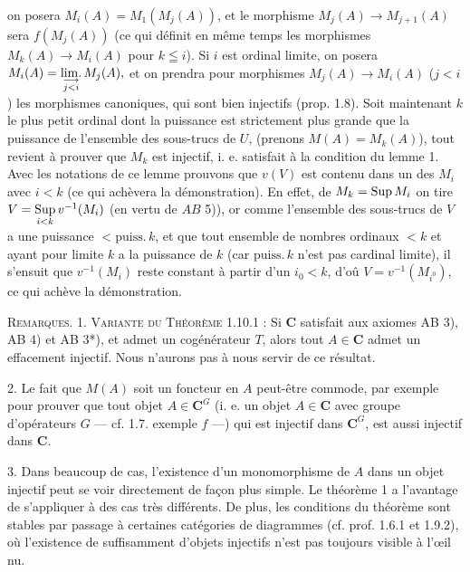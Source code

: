 
\noindent on posera $M_i(A)=M_1(M_j(A))$, et le morphisme
$M_j(A)\to M_{j+1}(A)$ sera $f(M_j(A))$ (ce qui définit en même
temps les morphismes $M_k(A)\to M_i(A)$ pour $k\leqq i$). Si $i$
est ordinal limite, on posera
$M_i(A)=\mathop{\rm lim.}\limits_{\substack{\longrightarrow\\j<i}}M_j(A),$ et on prendra pour morphismes $M_j(A)\to M_i(A)$
($j<i$) les morphismes canoniques, qui sont bien injectifs (prop. 1.8). Soit
maintenant $k$ le plus petit ordinal dont la puissance est strictement plus
grande que la puissance de l'ensemble des sous-trucs de $U$, (prenons
$M(A)=M_k(A)$), tout revient à prouver que $M_k$ est injectif, i. e. satisfait
à la condition du lemme 1. Avec les notations de ce lemme prouvons que $v(V)$
est contenu dans un des $M_i$ avec $i<k$ (ce qui achèvera la démonstration).
En effet, de $M_k=\mathop{\rm Sup}M_i$ on tire
$V=\mathop{\rm Sup}\limits_{i<k}v^{-1}(M_i)$ (en vertu de $AB$ 5)), or comme l'ensemble des sous-trucs de $V$ a une
puissance $<\mathrm{puiss.}\,k$, et que tout ensemble de nombres ordinaux $<k$
et ayant pour limite $k$ a la puissance de $k$ (car $\mathrm{puiss.}\,k$ n'est
pas cardinal limite), il s'ensuit que $v^{-1}(M_i)$ reste constant à partir
d'un $i_0<k$, d'oû $V=v^{-1}(M_{i^0})$, ce qui achève la démonstration.

\textsc{Remarques. 1. Variante du Théorème 1.10.1 :} Si $\mathbf{C}$ satisfait
aux axiomes AB 3), AB 4) et AB 3*), et admet un cogénérateur $T$, alors tout
$A\in \mathbf{C}$ admet un effacement injectif. Nous n'aurons pas à nous servir de ce
résultat.

 2. Le fait que $M(A)$ soit un foncteur en $A$ peut-être commode, par
exemple pour prouver que tout objet $A\in \mathbf{C}^G$ (i. e. un objet $A\in \mathbf{C}$ avec
groupe d'opérateurs $G$ --- cf. 1.7. exemple $f$ ---) qui est injectif dans
$\mathbf{C}^G$, est aussi injectif dans $\mathbf{C}$.

 3. Dans beaucoup de cas, l'existence d'un monomorphisme de $A$ dans
un objet injectif peut se voir directement de façon plus simple. Le théorème 1
a l'avantage de s'appliquer à des cas très différents. De plus, les conditions
du théorème sont stables par passage à certaines catégories de diagrammes
(cf. prof. 1.6.1 et 1.9.2), où l'existence de suffisamment d'objets injectifs
n'est pas toujours visible à l'œil nu.

